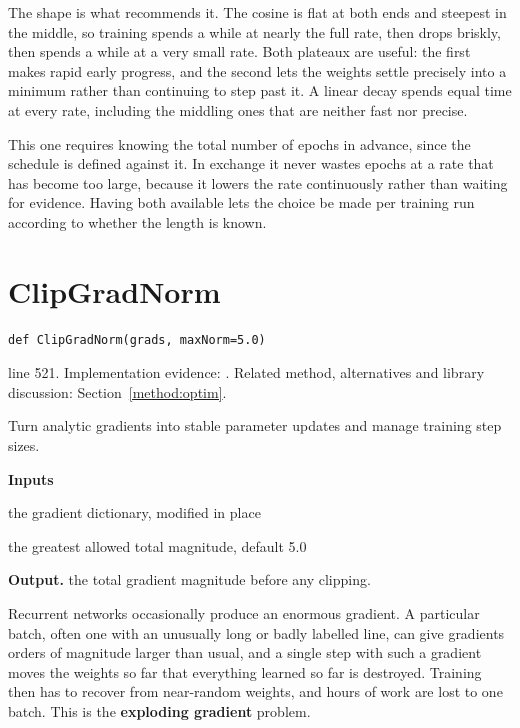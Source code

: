 The shape is what recommends it. The cosine is flat at both ends and steepest in the middle, so training spends a while at nearly the full rate, then drops briskly, then spends a while at a very small rate. Both plateaux are useful: the first makes rapid early progress, and the second lets the weights settle precisely into a minimum rather than continuing to step past it. A linear decay spends equal time at every rate, including the middling ones that are neither fast nor precise.


This one requires knowing the total number of epochs in advance, since the schedule is defined against it. In exchange it never wastes epochs at a rate that has become too large, because it lowers the rate continuously rather than waiting for evidence. Having both available lets the choice be made per training run according to whether the length is known.



\section{ClipGradNorm}\label{fn:train:ClipGradNorm}
\begin{lstlisting}[style=sig]
def ClipGradNorm(grads, maxNorm=5.0)
\end{lstlisting}
 line 521. Implementation evidence: \cite{code2026}. Related method, alternatives and library discussion: Section~\ref{method:optim}.


Turn analytic gradients into stable parameter updates and manage training step sizes.




\noindent\textbf{Inputs}
\begin{description}[leftmargin=2.2em,style=nextline,font=\normalfont\ttfamily]\setlength\itemsep{1pt}
  \item[{grads}] \normalfont the gradient dictionary, modified in place
  \item[{maxNorm}] \normalfont the greatest allowed total magnitude, default 5.0
\end{description}

\noindent\textbf{Output.} the total gradient magnitude before any clipping.


Recurrent networks occasionally produce an enormous gradient. A particular batch, often one with an unusually long or badly labelled line, can give gradients orders of magnitude larger than usual, and a single step with such a gradient moves the weights so far that everything learned so far is destroyed. Training then has to recover from near-random weights, and hours of work are lost to one batch. This is the \textbf{exploding gradient} problem.


